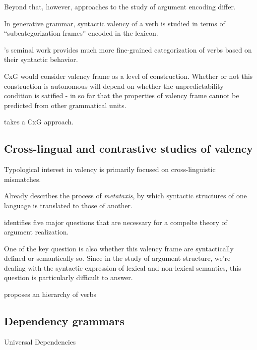Beyond that, however, approaches to the study of argument encoding differ.

In generative grammar, syntactic valency of a verb is studied in terms of ``subcategorization frames'' encoded in the lexicon. 

\citet{levin1993}'s seminal work provides much more fine-grained categorization of verbs based on their syntactic behavior. 

\citep{fillmore1967,fillmore1970} 


CxG would consider valency frame as a level of construction. Whether or not this construction is autonomous will depend on whether the unpredictability condition is satified - in so far that the properties of valency frame cannot be predicted from other grammatical units.

\citet{croft2012} takes a CxG approach. 


\subsection{Cross-lingual and contrastive studies of valency}

Typological interest in valency is primarily focused on cross-linguistic mismatches.

Already \citet{tesniere1959} describes the process of \textit{metataxis}, by which syntactic structures of one language is translated to those of another.  

\citet{levin2005} identifies five major questions that are necessary for a compelte theory of argument realization.


One of the key question is also whether this valency frame are syntactically defined or semantically so. Since in the study of argument structure, we're dealing with the syntactic expression of lexical and non-lexical semantics, this question is particularly difficult to answer.


\citet{tsunoda1981, tsunoda1985} proposes an hierarchy of verbs



\subsection{Dependency grammars}

Universal Dependencies 



